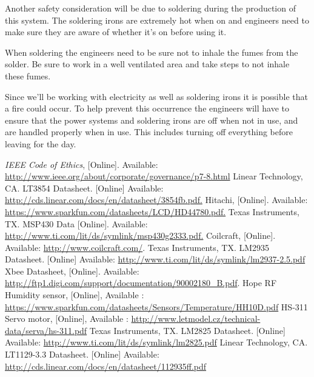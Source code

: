 Another safety consideration will be due to soldering during the production of this system. The soldering irons are extremely hot when on and engineers need to make sure they are aware of whether it's on before using it.

When soldering the engineers need to be sure not to inhale the fumes from the solder. Be sure to work in a well ventilated area and take steps to not inhale these fumes.

Since we'll be working with electricity as well as soldering irons it is possible that a fire could occur. To help prevent this occurrence the engineers will have to ensure that the power systems and soldering irons are off when not in use, and are handled properly when in use. This includes turning off everything before leaving for the day.

\pagebreak
\begin{thebibliography}{10}
\textit{IEEE Code of Ethics}, [Online]. Available: \url{http://www.ieee.org/about/corporate/governance/p7-8.html}
Linear Technology, CA. LT3854 Datasheet. [Online] Available: \url{http://cds.linear.com/docs/en/datasheet/3854fb.pdf.}
Hitachi, [Online]. Available: \url{https://www.sparkfun.com/datasheets/LCD/HD44780.pdf.}
Texas Instruments, TX. MSP430 Data [Online]. Available: \url{http://www.ti.com/lit/ds/symlink/msp430g2333.pdf.}
Coilcraft, [Online]. Available: \url{http://www.coilcraft.com/}.
Texas Instruments, TX. LM2935 Datasheet. [Online] Available: \url{http://www.ti.com/lit/ds/symlink/lm2937-2.5.pdf}
Xbee Datasheet, [Online]. Available: \url{http://ftp1.digi.com/support/documentation/90002180\_B.pdf}.
Hope RF Humidity sensor, [Online], Available : \url{https://www.sparkfun.com/datasheets/Sensors/Temperature/HH10D.pdf}
HS-311 Servo motor, [Online], Available : \url{http://www.letmodel.cz/technical-data/serva/hs-311.pdf}
Texas Instruments, TX. LM2825 Datasheet. [Online] Available: \url{http://www.ti.com/lit/ds/symlink/lm2825.pdf}
Linear Technology, CA. LT1129-3.3 Datasheet. [Online] Available: \url{http://cds.linear.com/docs/en/datasheet/112935ff.pdf}
\end{thebibliography}
